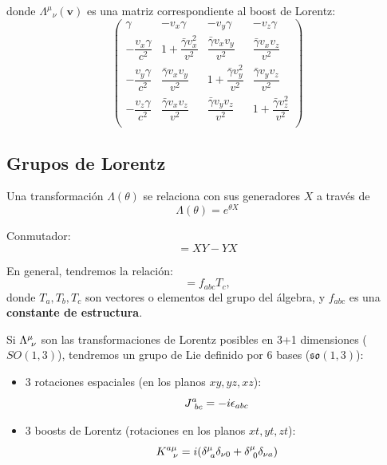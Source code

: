 \documentclass[]{report}
\numberwithin{equation}{section}
\newcommand{\LambdaMuNu}{\indUpDown}
\newcommand{\0}{\textcolor{gray}{0}}
\begin{document}
donde ${\Lambda^\mu}_\nu (\mathbf{v})$ es una matriz correspondiente al boost de Lorentz:
\begin{equation}
	\begin{pmatrix}
		\gamma & -v_x\gamma & -v_y\gamma & -v_z\gamma \\
		-\dfrac{v_x\gamma}{c^2} & 1+\dfrac{\bar{\gamma}v_x^2}{v^2} & \dfrac{\bar{\gamma}v_xv_y}{v^2} & \dfrac{\bar{\gamma}v_xv_z}{v^2}\\
		-\dfrac{v_y\gamma}{c^2} & \dfrac{\bar{\gamma}v_xv_y}{v^2} & 1+\dfrac{\bar{\gamma}v_y^2}{v^2} & \dfrac{\bar{\gamma}v_yv_z}{v^2}\\
		-\dfrac{v_z\gamma}{c^2} & \dfrac{\bar{\gamma}v_xv_z}{v^2} & \dfrac{\bar{\gamma}v_yv_z}{v^2} & 1+\dfrac{\bar{\gamma}v_z^2}{v^2} \\
	\end{pmatrix}
\end{equation}

\subsection{Grupos de Lorentz}
Una transformación \(\Lambda(\theta)\) se relaciona con sus generadores \(X\) a través de
\begin{equation}
	\Lambda(\theta) = e^{\theta X}
\end{equation}

Conmutador:
\begin{equation}
	[X, Y] = XY - YX
\end{equation}

En general, tendremos la relación:
\begin{equation}
	[T_a,T_b]=f_{abc}T_c,
\end{equation}
donde \(T_a,T_b,T_c\) son vectores o elementos del grupo del álgebra, y \(f_{abc}\) es una \textbf{constante de estructura}.

Si \(\LambdaMuNu\) son las transformaciones de Lorentz posibles en 3+1 dimensiones (\(SO(1,3)\)), tendremos un grupo de Lie definido por 6 bases (\(\mathfrak{so}(1,3)\)):
\begin{itemize}
	\item 3 rotaciones espaciales (en los planos \(xy, yz, xz\)):
	\begin{equation}
		\indUpDown[J][a][bc] = -i \epsilon_{abc}
	\end{equation}
	\item 3 boosts de Lorentz (rotaciones en los planos \(xt, yt, zt\)):
	\begin{equation}
		\indUpDown[K][a\mu][\ \nu] = i(\indUpDown[\delta][\mu][a]\delta_{\nu 0} + \indUpDown[\delta][\mu][0]\delta_{\nu a})
	\end{equation}
\end{itemize}
\end{document}
